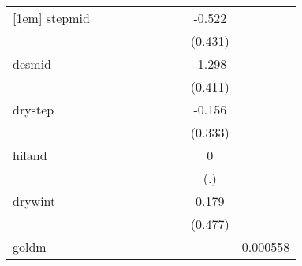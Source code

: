 {\begin{tabular}{l*{9}{c}}
[1em]
stepmid     &                     &                     &                     &                     &                     &                     &                     &      -0.522         &                     \\
            &                     &                     &                     &                     &                     &                     &                     &     (0.431)         &                     \\
[1em]
desmid      &                     &                     &                     &                     &                     &                     &                     &      -1.298\sym{***}&                     \\
            &                     &                     &                     &                     &                     &                     &                     &     (0.411)         &                     \\
[1em]
drystep     &                     &                     &                     &                     &                     &                     &                     &      -0.156         &                     \\
            &                     &                     &                     &                     &                     &                     &                     &     (0.333)         &                     \\
[1em]
hiland      &                     &                     &                     &                     &                     &                     &                     &           0         &                     \\
            &                     &                     &                     &                     &                     &                     &                     &         (.)         &                     \\
[1em]
drywint     &                     &                     &                     &                     &                     &                     &                     &       0.179         &                     \\
            &                     &                     &                     &                     &                     &                     &                     &     (0.477)         &                     \\
[1em]
goldm       &                     &                     &                     &                     &                     &                     &                     &                     &    0.000558         \\

\end{tabular}}

